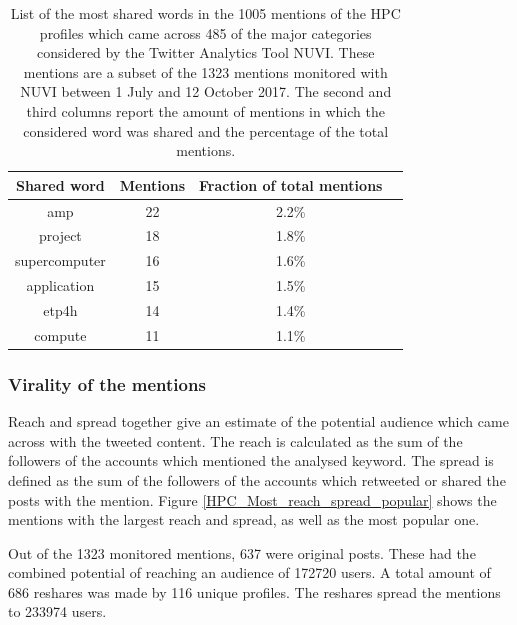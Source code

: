 \begin{table}[t]
 \begin{center}
  \begin{tabular}{cccc}
   \hline 
   \hline
   Shared word & Mentions & Fraction of total mentions \\ 
   \hline
   \hline
   amp & 22 & 2.2\% \\
   project & 18 & 1.8\% \\
   supercomputer & 16 & 1.6\% \\
   application & 15 & 1.5\% \\
   etp4h & 14 & 1.4\% \\
   compute & 11 & 1.1\% \\
   \hline
   \hline
  \end{tabular}
 \end{center} 
 \caption{List of the most shared words in the 1005 mentions of the HPC profiles which came across 485 of the major categories considered by the Twitter Analytics Tool NUVI. These mentions are a subset of the 1323 mentions monitored with NUVI between 1 July and 12 October 2017. The second and third columns report the amount of mentions in which the considered word was shared and the percentage of the total mentions. }
\label{Most_shared_words} 
\end{table}

\subsubsection{Virality of the mentions}
Reach and spread together give an estimate of the potential audience which came across with the tweeted content. The reach is calculated as the sum of the followers of the accounts which mentioned the analysed keyword. The spread is defined as the sum of the followers of the accounts which retweeted or shared the posts with the mention. Figure \ref{HPC_Most_reach_spread_popular} shows the mentions with the largest reach and spread, as well as the most popular one.

Out of the 1323 monitored mentions, 637 were original posts. These had the combined potential of reaching an audience of 172720 users. A total amount of 686 reshares was made by 116 unique profiles. The reshares spread the mentions to 233974 users.


